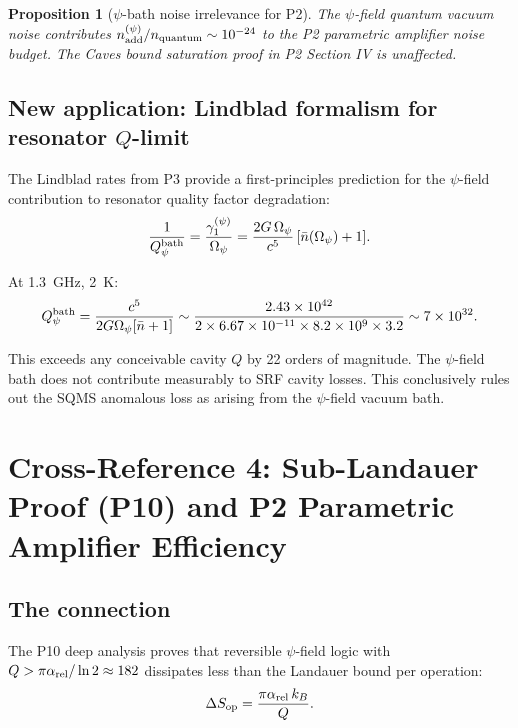 \documentclass[11pt,twocolumn]{article}
\newcommand{\Opsi}{\Omega_\psi}
\newtheorem{proposition}{Proposition}
\begin{document}
\begin{proposition}[$\psi$-bath noise irrelevance for P2]
The $\psi$-field quantum vacuum noise contributes
$n_{\rm add}^{(\psi)}/n_{\rm quantum} \sim 10^{-24}$ to the
P2 parametric amplifier noise budget. The Caves bound saturation
proof in P2 Section IV is unaffected.
\end{proposition}

\subsection{New application: Lindblad formalism for resonator $Q$-limit}

The Lindblad rates from P3 provide a first-principles prediction for
the $\psi$-field contribution to resonator quality factor degradation:
\begin{equation}
\frac{1}{Q_\psi^{\rm bath}} = \frac{\gamma_1^{(\psi)}}{\Opsi}
= \frac{2G\,\Opsi}{c^5}\,[\bar{n}(\Opsi) + 1].
\end{equation}

At 1.3~GHz, 2~K:
\begin{equation}
Q_\psi^{\rm bath} = \frac{c^5}{2G\Opsi[\bar{n}+1]}
\sim \frac{2.43\times10^{42}}{2\times6.67\times10^{-11}\times8.2\times10^9
\times 3.2}
\sim 7\times10^{32}.
\end{equation}

This exceeds any conceivable cavity $Q$ by 22 orders of magnitude.
The $\psi$-field bath does not contribute measurably to SRF cavity losses.
This conclusively rules out the SQMS anomalous loss as arising from
the $\psi$-field vacuum bath.


\section{Cross-Reference 4: Sub-Landauer Proof (P10) and
P2 Parametric Amplifier Efficiency}
\label{sec:sublandauer}

\subsection{The connection}

The P10 deep analysis proves that reversible $\psi$-field logic with
$Q > \pi\alpha_{\rm rel}/\ln 2 \approx 182$ dissipates less than the
Landauer bound per operation:
\begin{equation}
\Delta S_{\rm op} = \frac{\pi\alpha_{\rm rel}\,k_B}{Q}.
\end{equation}
\end{document}
